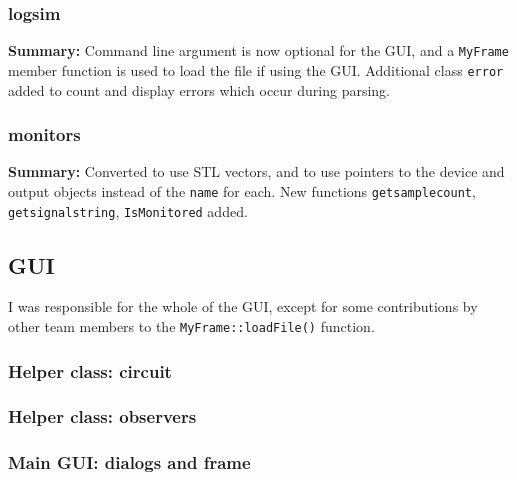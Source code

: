 \documentclass[landscape,twocolumn,a4paper,10pt]{article}
\begin{document}



\subsubsection{logsim}

\textbf{Summary:} Command line argument is now optional for the GUI, and a \texttt{MyFrame} member function is used to load the file if using the GUI. Additional class \texttt{error} added to count and display errors which occur during parsing.




\subsubsection{monitors}

\textbf{Summary:} Converted to use STL vectors, and to use pointers to the device and output objects instead of the \texttt{name} for each. New functions \texttt{getsamplecount}, \texttt{getsignalstring}, \texttt{IsMonitored} added.





\subsection{GUI}

I was responsible for the whole of the GUI, except for some contributions by other team members to the \texttt{MyFrame::loadFile()} function.

\subsubsection{Helper class: circuit}


\subsubsection{Helper class: observers}

\subsubsection{Main GUI: dialogs and frame}


\end{document}
